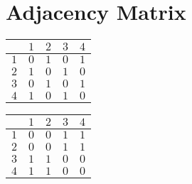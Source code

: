 \documentclass[a4paper]{tufte-handout}
\begin{document}
\section{Adjacency Matrix}

    \begin{minipage}{0.3\columnwidth}
    \centering
    \begin{tabular}{ c|cccc } 
          & $1$ & $2$ & $3$ & $4$ \\
        \hline
        $1$ & $0$ & $1$ & $0$ & $1$ \\ 
        $2$ & $1$ & $0$ & $1$ & $0$ \\ 
        $3$ & $0$ & $1$ & $0$ & $1$ \\ 
        $4$ & $1$ & $0$ & $1$ & $0$ \\ 
    \end{tabular}
    \end{minipage}
        \begin{minipage}{0.3\columnwidth}
    \centering
    \begin{tabular}{ c|cccc } 
           & $1$ & $2$ & $3$ & $4$ \\
         \hline
         $1$ & $0$ & $0$ & $1$ & $1$ \\ 
         $2$ & $0$ & $0$ & $1$ & $1$ \\ 
         $3$ & $1$ & $1$ & $0$ & $0$ \\ 
         $4$ & $1$ & $1$ & $0$ & $0$ \\ 
    \end{tabular}
    \end{minipage}
    \begin{marginfigure}
    \begin{adjustbox}{max width={\columnwidth}, center}
    \end{adjustbox}
    \end{marginfigure}
\end{document}
